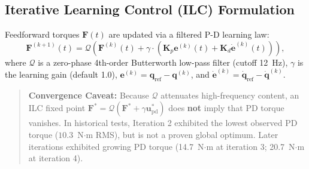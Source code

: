 \documentclass[11pt,a4paper]{article}
\begin{document}
\subsection{Iterative Learning Control (ILC) Formulation}
Feedforward torques $\mathbf{F}(t)$ are updated via a filtered P-D learning law:
\begin{equation}
    \mathbf{F}^{(k+1)}(t) = \mathcal{Q}\left(\mathbf{F}^{(k)}(t) + \gamma \cdot \left(\mathbf{K}_p \mathbf{e}^{(k)}(t) + \mathbf{K}_d \dot{\mathbf{e}}^{(k)}(t)\right)\right),
\end{equation}
where $\mathcal{Q}$ is a zero-phase 4th-order Butterworth low-pass filter (cutoff 12~Hz), $\gamma$ is the learning gain (default 1.0), $\mathbf{e}^{(k)} = \mathbf{q}_{\text{ref}} - \mathbf{q}^{(k)}$, and $\dot{\mathbf{e}}^{(k)} = \dot{\mathbf{q}}_{\text{ref}} - \dot{\mathbf{q}}^{(k)}$.

\begin{quote}
\textbf{Convergence Caveat:} Because $\mathcal{Q}$ attenuates high-frequency content, an ILC fixed point $\mathbf{F}^* = \mathcal{Q}(\mathbf{F}^* + \gamma \mathbf{u}_{\text{pd}}^*)$ does \textbf{not} imply that PD torque vanishes. In historical tests, Iteration 2 exhibited the lowest observed PD torque ($10.3$~N$\cdot$m RMS), but is not a proven global optimum. Later iterations exhibited growing PD torque (14.7~N$\cdot$m at iteration 3; 20.7~N$\cdot$m at iteration 4).
\end{quote}
\end{document}
